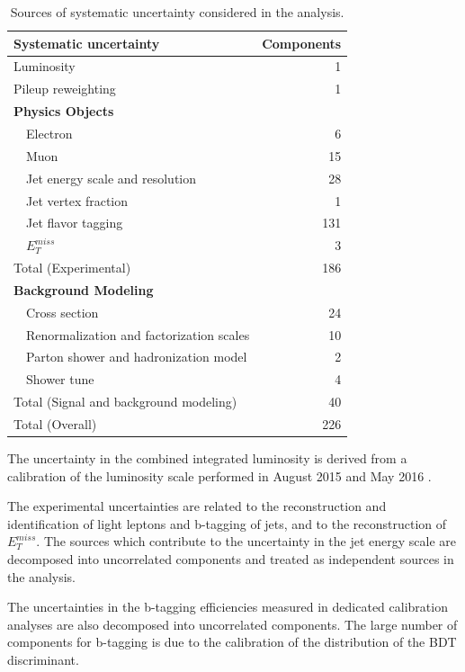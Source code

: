 \documentclass[NOTE, atlasdraft=true, texlive=2016, UKenglish]{\ATLASLATEXPATH atlasdoc}
\begin{document}
\begin{table}[h]
\centering
\caption{Sources of systematic uncertainty considered in the analysis.}
\begin{tabular}{lr}
\hline\hline
Systematic uncertainty & Components  	      \\
\hline
\hline
Luminosity	& 1		      \\
Pileup reweighting 	& 1		      \\
\textbf {Physics Objects}     	&		      \\
\ \ Electron                               	& 6		      \\
\ \ Muon	& 15		      \\
\ \ Jet energy scale and resolution  	& 28                  \\
\ \ Jet vertex fraction  	& 1		      \\
\ \ Jet flavor tagging   	& 131		      \\
\ \ $E^{miss}_T$  	& 3		      \\
\hline
Total (Experimental)        & 186		     \\
\hline
\hline
\textbf {Background Modeling}          	&		      \\
\ \ Cross section                 	& 24		      \\
\ \ Renormalization and factorization scales 	& 10		      \\
\ \ Parton shower and hadronization model       	& 2		      \\
\ \ Shower tune				& 4		      \\
\hline
Total (Signal and background modeling)       & 40		     \\
\hline\hline
Total (Overall)                             & 226	      \\
\hline\hline
\end{tabular}
\label{tab:SystSummary}
\end{table}

The uncertainty in the combined integrated luminosity is derived from a calibration of the luminosity scale performed in August 2015 and May 2016 \cite{lumi}.

The experimental uncertainties are related to the reconstruction and identification of light leptons and b-tagging of jets, and to the reconstruction of $E^{miss}_T$. The sources which contribute to the uncertainty in the jet energy scale \cite{jes} are decomposed into uncorrelated components and treated as independent sources in the analysis. 

The uncertainties in the b-tagging efficiencies measured in dedicated calibration analyses \cite{btag_cal} are also decomposed into uncorrelated components. The large number of components for b-tagging is due to the calibration of the distribution of the BDT discriminant.  
\end{document}

